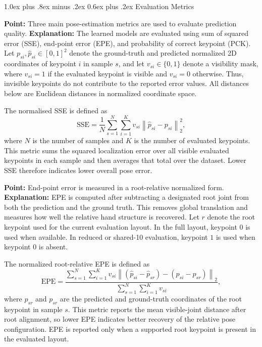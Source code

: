 \documentclass[10pt,letterpaper]{article}
\makeatletter
\renewcommand\subsection{\@startsection{subsection}{2}{\z@}%
  {1.0ex plus .8ex minus .2ex}%
  {0.6ex plus .2ex}%
  {\normalfont\itshape}}
\makeatother
\begin{document}
\subsection{Evaluation Metrics}

\noindent\textbf{Point:} Three main pose-estimation metrics are used to evaluate prediction quality.  
\textbf{Explanation:} The learned models are evaluated using sum of squared error (SSE), end-point error (EPE), and probability of correct keypoint (PCK). Let \(p_{si}, \hat{p}_{si} \in [0,1]^2\) denote the ground-truth and predicted normalized 2D coordinates of keypoint \(i\) in sample \(s\), and let \(v_{si} \in \{0,1\}\) denote a visibility mask, where \(v_{si}=1\) if the evaluated keypoint is visible and \(v_{si}=0\) otherwise. Thus, invisible keypoints do not contribute to the reported error values. All distances below are Euclidean distances in normalized coordinate space.

The normalised SSE is defined as
\[
\mathrm{SSE} =
\frac{1}{N}
\sum_{s=1}^{N}
\sum_{i=1}^{K}
v_{si}\left\|
\hat{p}_{si} - p_{si}
\right\|_2^2,
\]
where \(N\) is the number of samples and \(K\) is the number of evaluated keypoints. This metric sums the squared localization error over all visible evaluated keypoints in each sample and then averages that total over the dataset. Lower SSE therefore indicates lower overall pose error.

\medskip
\noindent\textbf{Point:} End-point error is measured in a root-relative normalized form.  
\textbf{Explanation:} EPE is computed after subtracting a designated root joint from both the prediction and the ground truth. This removes global translation and measures how well the relative hand structure is recovered. Let \(r\) denote the root keypoint used for the current evaluation layout. In the full layout, keypoint \(0\) is used when available. In reduced or shared-10 evaluation, keypoint \(1\) is used when keypoint \(0\) is absent.

The normalized root-relative EPE is defined as
\[
\mathrm{EPE} =
\frac{
\sum_{s=1}^{N}
\sum_{i=1}^{K}
v_{si}
\left\|
(\hat{p}_{si} - \hat{p}_{sr}) - (p_{si} - p_{sr})
\right\|_2
}{
\sum_{s=1}^{N}
\sum_{i=1}^{K}
v_{si}
},
\]
where \(\hat{p}_{sr}\) and \(p_{sr}\) are the predicted and ground-truth coordinates of the root keypoint in sample \(s\). This metric reports the mean visible-joint distance after root alignment, so lower EPE indicates better recovery of the relative pose configuration. EPE is reported only when a supported root keypoint is present in the evaluated layout.
\end{document}
